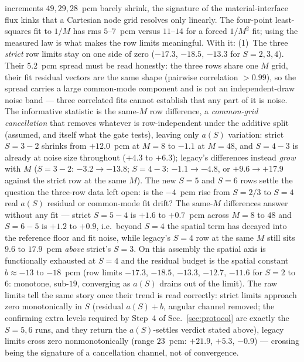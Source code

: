 \documentclass[11pt,a4paper]{article}
\begin{document}
increments $49,29,28$~pcm barely shrink, the signature of the
material-interface flux kinks that a Cartesian node grid resolves only
linearly.  The four-point least-squares fit to $1/M$ has rms
$5$--$7$~pcm versus $11$--$14$ for a forced $1/M^2$ fit; using the
measured law is what makes the row limits meaningful.  With it:
(1)~The three \emph{strict} row limits stay on one side of zero
($-17.3$, $-18.5$, $-13.3$ for $S=2,3,4$).  Their $5.2$~pcm spread
must be read honestly: the three rows share one $M$ grid, their fit
residual vectors are the same shape (pairwise correlation $>0.99$),
so the spread carries a large common-mode component and is not an
independent-draw noise band --- three correlated fits cannot
establish that any part of it is noise.  The informative statistic
is the same-$M$ row difference, a \emph{common-grid cancellation}
that removes whatever is row-independent under the additive split
(assumed, and itself what the gate tests), leaving only $a(S)$
variation:
strict $S{=}3{-}2$ shrinks from $+12.0$~pcm at $M{=}8$ to $-1.1$ at
$M{=}48$, and $S{=}4{-}3$ is already at noise size throughout
($+4.3$ to $+6.3$); legacy's differences instead \emph{grow} with $M$
($S{=}3{-}2$: $-3.2\to-13.8$; $S{=}4{-}3$: $-1.1\to-4.8$, or
$+9.6\to+17.9$ against the strict row at the same $M$).  The new
$S{=}5$ and $S{=}6$ rows settle the question the three-row data left
open: is the $-4$~pcm rise from $S{=}2/3$ to $S{=}4$ real $a(S)$
residual or common-mode fit drift?  The same-$M$ differences answer
without any fit --- strict $S{=}5{-}4$ is $+1.6$ to $+0.7$~pcm
across $M=8$ to $48$ and $S{=}6{-}5$ is $+1.2$ to $+0.9$, i.e.\ beyond
$S{=}4$ the spatial term has decayed into the reference floor and fit
noise, while legacy's $S{=}4$ row at the same $M$ still sits $9.6$
to $17.9$~pcm \emph{above} strict's $S{=}3$.  On this assembly the
spatial axis is functionally exhausted at $S{=}4$ and the residual
budget is the spatial constant $b\approx-13$ to $-18$~pcm (row
limits $-17.3$, $-18.5$, $-13.3$, $-12.7$, $-11.6$ for $S=2$ to $6$:
monotone, sub-$19$, converging as $a(S)$ drains out of the limit).
The raw limits tell the same story once their trend is read
correctly:
strict limits approach zero monotonically in $S$ (residual
$a(S){+}b$, angular channel removed; the confirming extra levels
required by Step~4 of Sec.~\ref{sec:protocol} are exactly the
$S{=}5,6$ runs, and they return the $a(S)$-settles verdict stated
above), legacy limits cross zero nonmonotonically
(range $23$~pcm: $+21.9$, $+5.3$, $-0.9$) --- crossing being the
signature of a cancellation channel, not of convergence.
\end{document}
